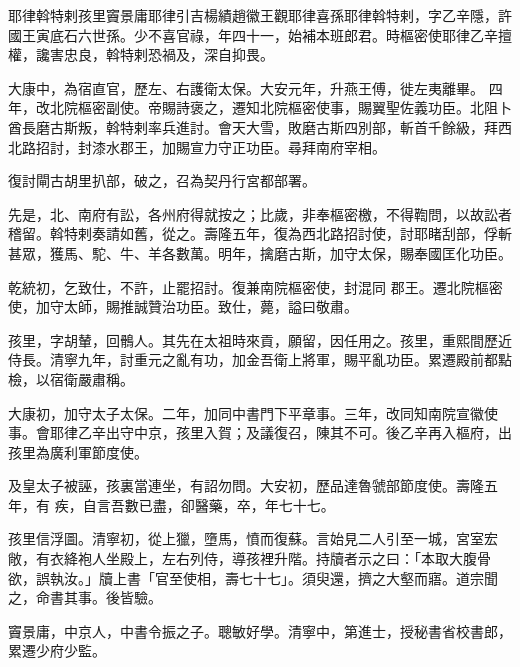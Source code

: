 
\begin{pinyinscope}

 耶律斡特剌孩里竇景庸耶律引吉楊績趙徽王觀耶律喜孫耶律斡特剌，字乙辛隱，許國王寅底石六世孫。少不喜官祿，年四十一，始補本班郎君。時樞密使耶律乙辛擅權，讒害忠良，斡特剌恐禍及，深自抑畏。



 大康中，為宿直官，歷左、右護衛太保。大安元年，升燕王傅，徙左夷離畢。
 四年，改北院樞密副使。帝賜詩褒之，遷知北院樞密使事，賜翼聖佐義功臣。北阻卜酋長磨古斯叛，斡特剌率兵進討。會天大雪，敗磨古斯四別部，斬首千餘級，拜西北路招討，封漆水郡王，加賜宣力守正功臣。尋拜南府宰相。



 復討閘古胡里扒部，破之，召為契丹行宮都部署。



 先是，北、南府有訟，各州府得就按之；比歲，非奉樞密檄，不得鞫問，以故訟者稽留。斡特剌奏請如舊，從之。壽隆五年，復為西北路招討使，討耶睹刮部，俘斬甚眾，獲馬、駝、牛、羊各數萬。明年，擒磨古斯，加守太保，賜奉國匡化功臣。



 乾統初，乞致仕，不許，止罷招討。復兼南院樞密使，封混同
 郡王。遷北院樞密使，加守太師，賜推誠贊治功臣。致仕，薨，謚曰敬肅。



 孩里，字胡輦，回鶻人。其先在太祖時來貢，願留，因任用之。孩里，重熙間歷近侍長。清寧九年，討重元之亂有功，加金吾衛上將軍，賜平亂功臣。累遷殿前都點檢，以宿衛嚴肅稱。



 大康初，加守太子太保。二年，加同中書門下平章事。三年，改同知南院宣徽使事。會耶律乙辛出守中京，孩里入賀；及議復召，陳其不可。後乙辛再入樞府，出孩里為廣利軍節度使。



 及皇太子被誣，孩裏當連坐，有詔勿問。大安初，歷品達魯虢部節度使。壽隆五年，有
 疾，自言吾數已盡，卻醫藥，卒，年七十七。



 孩里信浮圖。清寧初，從上獵，墮馬，憤而復蘇。言始見二人引至一城，宮室宏敞，有衣絳袍人坐殿上，左右列侍，導孩裡升階。持牘者示之曰：「本取大腹骨欲，誤執汝。」牘上書「官至使相，壽七十七」。須臾還，擠之大壑而寤。道宗聞之，命書其事。後皆驗。



 竇景庸，中京人，中書令振之子。聰敏好學。清寧中，第進士，授秘書省校書郎，累遷少府少監。




\end{pinyinscope}
